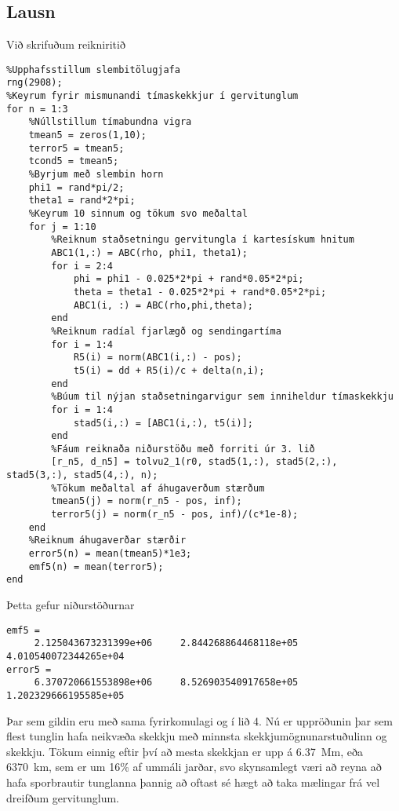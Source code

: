 \documentclass[11pt]{article}
\begin{document}
\subsection*{Lausn}

Við skrifuðum reikniritið

\begin{verbatim}
%Upphafsstillum slembitölugjafa
rng(2908);
%Keyrum fyrir mismunandi tímaskekkjur í gervitunglum
for n = 1:3
    %Núllstillum tímabundna vigra
    tmean5 = zeros(1,10);
    terror5 = tmean5;
    tcond5 = tmean5;
    %Byrjum með slembin horn
    phi1 = rand*pi/2; 
    theta1 = rand*2*pi;
    %Keyrum 10 sinnum og tökum svo meðaltal
    for j = 1:10
        %Reiknum staðsetningu gervitungla í kartesískum hnitum
        ABC1(1,:) = ABC(rho, phi1, theta1);
        for i = 2:4 
            phi = phi1 - 0.025*2*pi + rand*0.05*2*pi;
            theta = theta1 - 0.025*2*pi + rand*0.05*2*pi;
            ABC1(i, :) = ABC(rho,phi,theta);
        end
        %Reiknum radíal fjarlægð og sendingartíma
        for i = 1:4
            R5(i) = norm(ABC1(i,:) - pos);
            t5(i) = dd + R5(i)/c + delta(n,i);
        end
        %Búum til nýjan staðsetningarvigur sem inniheldur tímaskekkju
        for i = 1:4
            stad5(i,:) = [ABC1(i,:), t5(i)];
        end
        %Fáum reiknaða niðurstöðu með forriti úr 3. lið
        [r_n5, d_n5] = tolvu2_1(r0, stad5(1,:), stad5(2,:), stad5(3,:), stad5(4,:), n);
        %Tökum meðaltal af áhugaverðum stærðum
        tmean5(j) = norm(r_n5 - pos, inf);
        terror5(j) = norm(r_n5 - pos, inf)/(c*1e-8);
    end
    %Reiknum áhugaverðar stærðir
    error5(n) = mean(tmean5)*1e3;
    emf5(n) = mean(terror5);
end
\end{verbatim}
Þetta gefur niðurstöðurnar
\begin{verbatim}
emf5 =
     2.125043673231399e+06     2.844268864468118e+05     4.010540072344265e+04
error5 =
     6.370720661553898e+06     8.526903540917658e+05     1.202329666195585e+05
\end{verbatim}
Þar sem gildin eru með sama fyrirkomulagi og í lið 4. Nú er uppröðunin þar sem flest tunglin hafa neikvæða skekkju með minnsta skekkjumögnunarstuðulinn og skekkju. Tökum einnig eftir því að mesta skekkjan er upp á \SI{6.37}{\mega\metre}, eða \SI{6370}{\kilo\metre}, sem er um 16\% af ummáli jarðar, svo skynsamlegt væri að reyna að hafa sporbrautir tunglanna þannig að oftast sé hægt að taka mælingar frá vel dreifðum gervitunglum.
\newpage
\end{document}
